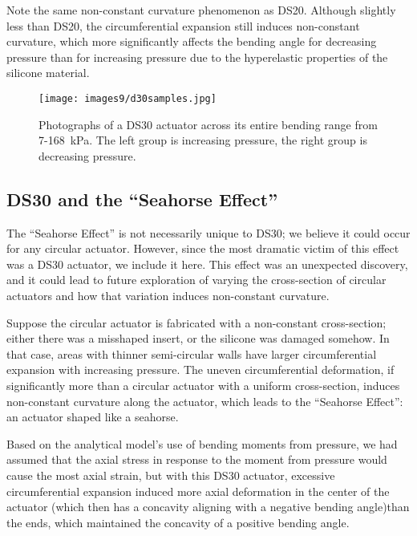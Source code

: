 Note the same non-constant curvature phenomenon as DS20. Although slightly less than DS20, the circumferential expansion still induces non-constant curvature, which more significantly affects the bending angle for decreasing pressure than for increasing pressure due to the hyperelastic properties of the silicone material. 
\\
\begin{figure}[ht]
    \centering
     \texttt{[image: images9/d30samples.jpg]}
    \caption{Photographs of a DS30 actuator across its entire bending range from 7-168~kPa. The left group is increasing pressure, the right group is decreasing pressure.}
    \label{fig:d30samples}
\end{figure}

\clearpage
\subsection{DS30 and the ``Seahorse Effect''}

The ``Seahorse Effect'' is not necessarily unique to DS30; we believe it could occur for any circular actuator. However, since the most dramatic victim of this effect was a DS30 actuator, we include it here. This effect was an unexpected discovery, and it could lead to future exploration of varying the cross-section of circular actuators and how that variation induces non-constant curvature. 

Suppose the circular actuator is fabricated with a non-constant cross-section; either there was a misshaped insert, or the silicone was damaged somehow. In that case, areas with thinner semi-circular walls have larger circumferential expansion with increasing pressure. The uneven circumferential deformation, if significantly more than a circular actuator with a uniform cross-section, induces non-constant curvature along the actuator, which leads to the ``Seahorse Effect'': an actuator shaped like a seahorse. 

Based on the analytical model's use of bending moments from pressure, we had assumed that the axial stress in response to the moment from pressure would cause the most axial strain, but with this DS30 actuator, excessive circumferential expansion induced more axial deformation in the center of the actuator (which then has a concavity aligning with a negative bending angle)than the ends, which maintained the concavity of a positive bending angle.  

